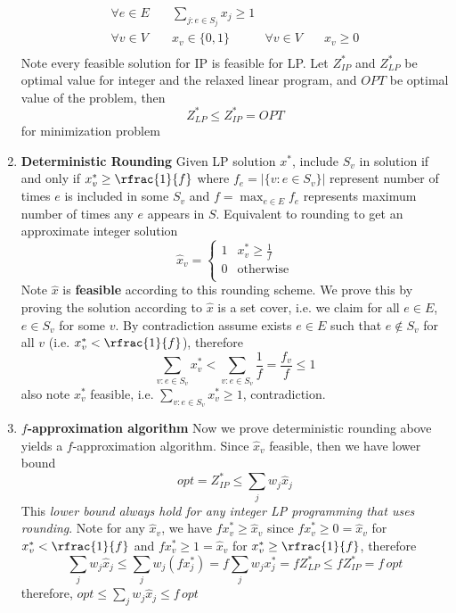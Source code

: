 \documentclass[11pt]{article}
\begin{document}
\begin{enumerate}
\begin{align*}
        \forall e\in E \quad & \sum_{j: e\in S_j} x_j \geq 1 
        \\
        \forall v\in V \quad & x_v \in \{0, 1 \} 
        & 
        \forall v\in V \quad & x_v \geq 0
        \\ 
    \end{align*}
    Note every feasible solution for IP is feasible for LP. Let $Z_{IP}^*$ and $Z_{LP}^*$ be optimal value for integer and the relaxed linear program, and $OPT$ be optimal value of the problem, then 
    \[
        Z_{LP}^* \leq Z_{IP}^* = OPT 
    \]
    for minimization problem
    \item \textbf{Deterministic Rounding} Given LP solution $x^*$, include $S_v$ in solution if and only if $x_v^* \geq \rfrac{1}{f}$ where $f_e = |\{ v : e\in S_v \}|$ represent number of times $e$ is included in some $S_v$ and $f = \max_{e\in E} f_e$ represents maximum number of times any $e$ appears in $S$. Equivalent to rounding to get an approximate integer solution
    \[
        \hat{x}_v = 
        \begin{cases}
            1 & x_v^* \geq \frac{1}{f} \\
            0 & \text{otherwise} \\ 
        \end{cases}    
    \]
    Note $\hat{x}$ is \textbf{feasible} according to this rounding scheme. We prove this by proving the solution according to $\hat{x}$ is a set cover, i.e. we claim for all $e\in E$, $e\in S_v$ for some $v$. By contradiction assume exists $e\in E$ such that $e\not\in S_v$ for all $v$ (i.e. $x_v^* < \rfrac{1}{f}$), therefore 
    \[
        \sum_{v:e\in S_v} x_v^*
        < \sum_{v:e\in S_v} \frac{1}{f}
        = \frac{f_v}{f} 
        \leq 1
    \]
    also note $x_v^*$ feasible, i.e. $\textstyle \sum_{v:e\in S_v} x_v^* \geq 1$, contradiction. 
    \item \textbf{$f$-approximation algorithm} Now we prove deterministic rounding above yields a $f$-approximation algorithm. Since $\hat{x}_v$ feasible, then we have lower bound 
    \[
        opt = Z_{IP}^* \leq \sum_{j} w_j \hat{x}_j
    \]
    This \textit{lower bound always hold for any integer LP programming that uses rounding}. Note for any $\hat{x}_v$, we have $f x_v^* \geq \hat{x}_v$ since $f x_v^* \geq 0 = \hat{x}_v$ for $x_v^* < \rfrac{1}{f}$ and $f x_v^* \geq 1 = \hat{x}_v$ for $x_v^* \geq \rfrac{1}{f}$, therefore 
    \[
        \sum_j w_j \hat{x}_j \leq \sum_j w_j (f x_j^*) = f \sum_j w_j x_j^* = f Z_{LP}^* \leq f Z_{IP}^* = f\, opt
    \]
    therefore, $opt \leq \textstyle \sum_j w_j \hat{x}_j \leq f \, opt$ 

\end{enumerate}
\end{document}
